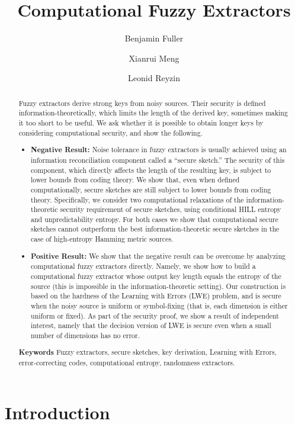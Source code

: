 \documentclass{llncs}
\title{\textbf{Computational Fuzzy Extractors}}
\author{Benjamin Fuller\inst{1} \and Xianrui Meng\inst{2} \and Leonid Reyzin\inst{2}}
\institute{Boston University and MIT Lincoln Laboratory \and Boston University}
\begin{document}
\maketitle


\begin{abstract} 
Fuzzy extractors derive strong keys from noisy sources.  Their
security is defined information-theoretically, which limits the length
of the derived key, sometimes making it too short to be useful. We ask
whether it is possible to obtain longer keys by considering
computational security, and show the following.

\begin{itemize}
\item\textbf{Negative Result:} Noise tolerance in fuzzy extractors is usually
achieved using an information reconciliation component called a ``secure
sketch.'' The security of this component, which directly affects the
length of the resulting key, is subject to lower bounds from coding
theory.  We show that, even when defined computationally, secure
sketches are still subject to lower bounds from coding theory. Specifically, we consider
two computational relaxations of the information-theoretic security requirement of secure sketches, using conditional HILL entropy and unpredictability entropy. For both cases we show  that computational secure sketches cannot outperform the best information-theoretic secure sketches in the case of high-entropy Hamming metric sources.

\item\textbf{Positive Result:} We show that the negative result can be overcome by
analyzing computational fuzzy extractors directly.  Namely, we show
how to build a computational fuzzy extractor whose output key length
equals the entropy of the source (this is impossible in the
information-theoretic setting). Our construction is based on the
hardness of the Learning with Errors (LWE) problem, and is secure when
the noisy source is uniform or symbol-fixing (that is, each dimension
is either uniform or fixed). As part of the security proof, we show a result of independent interest, namely
that the decision version of LWE is secure even when a small number of
dimensions has no error.
\end{itemize}
\textbf{Keywords} Fuzzy extractors, secure sketches, key derivation, Learning with Errors, error-correcting codes, computational entropy, randomness extractors.
\end{abstract}


\section{Introduction}\label{sec:introduction}
\end{document}

